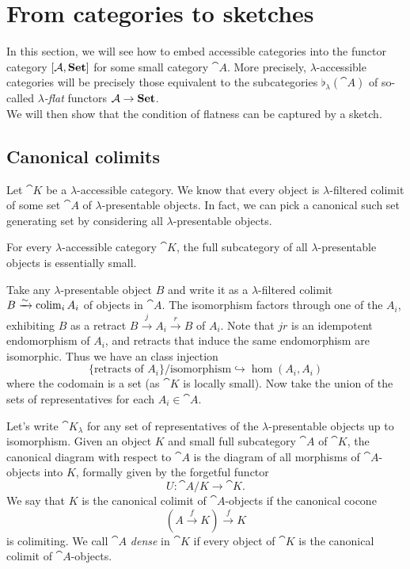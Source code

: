 \section{From categories to sketches}
\label{seq:catstoskeches}

In this section, we will see how to embed accessible categories into the functor category $[\mathcal{A},\mathbf{Set}]$ for some small category $\cat A$. More precisely, $\lambda$-accessible categories will be precisely those equivalent to the subcategories $\flat_\lambda(\cat A)$ of so-called \emph{$\lambda$-flat} functors $\mathcal{A} \to \mathbf{Set}$. \\

We will then show that the condition of flatness can be captured by a sketch.

\subsection{Canonical colimits}

Let $\cat K$ be a $\lambda$-accessible category. We know that every object is $\lambda$-filtered colimit of some set $\cat A$ of $\lambda$-presentable objects. In fact, we can pick a canonical such set generating set by considering all $\lambda$-presentable objects.

\begin{Proposition}
For every $\lambda$-accessible category $\cat K$, the full subcategory of all $\lambda$-presentable objects is essentially small. 
\end{Proposition}
\begin{Proof}
Take any $\lambda$-presentable object $B$ and write it as a $\lambda$-filtered colimit $B \xrightarrow{\sim} \operatorname{colim}_i A_i$ of objects in $\cat A$. The isomorphism factors through one of the $A_i$, exhibiting $B$ as a retract $B \xrightarrow{j} A_i \xrightarrow{r} B$ of $A_i$. Note that $jr$ is an idempotent endomorphism of $A_i$, and retracts that induce the same endomorphism are isomorphic. Thus we have an class injection
\[ \{ \text{retracts of } A_i \}/\text{isomorphism} \hookrightarrow \hom(A_i,A_i) \]
where the codomain is a set (as $\cat K$ is locally small). Now take the union of the sets of representatives for each $A_i \in \cat A$.
\end{Proof}

Let's write $\cat K_\lambda$ for any set of representatives of the $\lambda$-presentable objects up to isomorphism. Given an object $K$ and small full subcategory $\cat A$ of $\cat K$, the canonical diagram with respect to $\cat A$ is the diagram of all morphisms of $\cat A$-objects into $K$, formally given by the forgetful functor
\[ U : \cat A/K \to \cat K. \]
We say that $K$ is the canonical colimit of $\cat A$-objects if the canonical cocone
\[ (A \xrightarrow{f} K) \xrightarrow{f} K \]
is colimiting. We call $\cat A$ \emph{dense} in $\cat K$ if every object of $\cat K$ is the canonical colimit of $\cat A$-objects.


